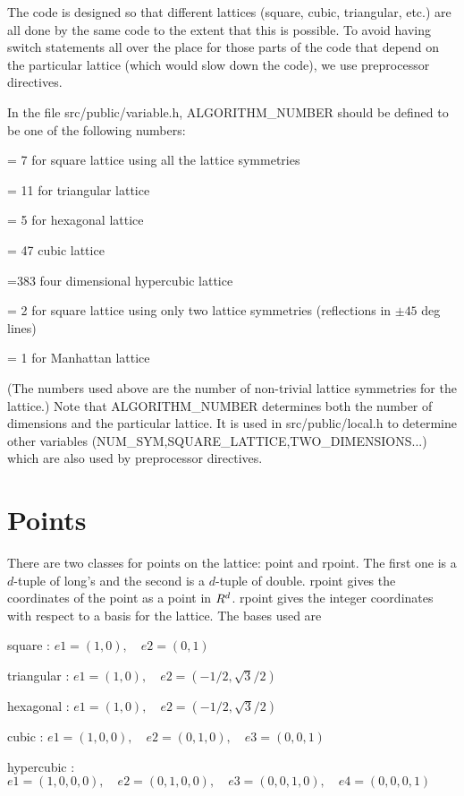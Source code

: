 The code is designed so that different lattices (square, cubic, triangular,
etc.) are all done by the same code to the extent that this is possible. 
To avoid having switch statements all over the place for those parts of 
the code that depend on the particular lattice (which would slow down 
the code), we use preprocessor directives. 

In the file src/public/variable.h,  ALGORITHM\_NUMBER should be defined 
to be one of the following numbers:

=  7 for square lattice using all the lattice symmetries

= 11 for triangular lattice

=  5 for hexagonal lattice 

= 47 cubic lattice

=383 four dimensional hypercubic lattice

=  2 for square lattice using only two lattice symmetries 
(reflections in $\pm 45$ deg lines)

=  1 for Manhattan lattice

\noindent 
(The numbers used above are the number of non-trivial lattice symmetries
for the lattice.) 
Note that ALGORITHM\_NUMBER determines both the number of dimensions and 
the particular lattice. It is used in src/public/local.h to determine
other variables (NUM\_SYM,SQUARE\_LATTICE,TWO\_DIMENSIONS...) which are also
used by preprocessor directives.


 
\section{Points}

There are two classes for points on the lattice: {\type point} 
and {\type rpoint}.
The first one is a $d$-tuple of {\type long}'s and the second is a 
$d$-tuple of {\type double}. {\type rpoint} gives the coordinates 
of the point as a point in $R^d$. 
{\type rpoint} gives the integer coordinates with respect to a basis 
for the lattice. The bases used are 

square :        $e1=(1,0), \quad  e2=(0,1)$

triangular :    $e1=(1,0), \quad  e2=(-1/2,\sqrt{3}/2)$

hexagonal :     $e1=(1,0), \quad  e2=(-1/2,\sqrt{3}/2)$

cubic :         $e1=(1,0,0), \quad e2=(0,1,0), \quad  e3=(0,0,1)$

hypercubic :    $e1=(1,0,0,0), \quad e2=(0,1,0,0), 
                \quad e3=(0,0,1,0), \quad e4=(0,0,0,1)$  

